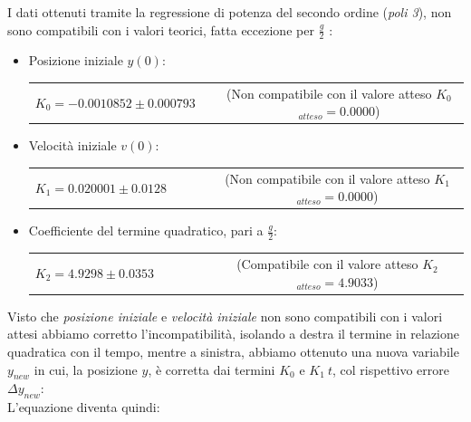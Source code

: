 \documentclass[12pt, a4paper]{article}
\begin{document}
I dati ottenuti tramite la regressione di potenza del secondo ordine (\textit{poli 3}), non sono compatibili con i valori teorici, fatta eccezione per $\displaystyle{\frac{g}{2}}$ :


\renewcommand{\theenumii}{\roman{enumii}}  
\begin{itemize}
    \itemsep0em 
    
        \item Posizione iniziale $y(0)$:
        
        \begin{tabular}{ccc}
        {$K_0 = -0.0010852 \pm 0.000793$} & & \small{(Non compatibile con il valore atteso $K_{0}$ $_{atteso}= 0.0000$)}\\
        \end{tabular}
        
    \end{itemize}
    \begin{itemize}
        \item Velocità iniziale $v(0)$:\\
        \begin{tabular}{ccccc}
        {$K_1 =  0.020001 \pm 0.0128$} & & & & \small{(Non compatibile con il valore atteso $K_{1}$ $_{atteso} = 0.0000$)}\\
        \end{tabular}
        
    \end{itemize}
      \begin{itemize}
          \item Coefficiente del termine quadratico, pari a $\displaystyle{\frac{g}{2}}$:\\ 
          \begin{tabular}{cccccc}
              {$K_2 =  4.9298 \pm 0.0353$} & & & & &\small{(Compatibile con il valore atteso $K_{2}$ $_{atteso}= 4.9033$)}\\
          \end{tabular}
         
      \end{itemize}
    \bigskip
Visto che \textit{posizione iniziale} e \textit{velocità iniziale} non sono compatibili con i valori attesi abbiamo corretto l'incompatibilità, isolando a destra il termine in relazione  quadratica con il tempo, mentre a sinistra, abbiamo ottenuto una nuova variabile $y_{new}$ in cui, la posizione $y$, è corretta dai termini $K_0$ e $ K_1\ t$, col rispettivo errore $\Delta y_{new}$: \\
L'equazione diventa quindi:
\end{document}
